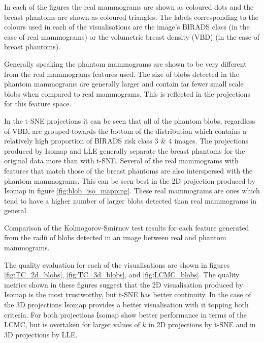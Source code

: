 In each of the figures the real mammograms are shown as coloured dots and the breast phantoms are shown as coloured triangles. The labels corresponding to the colours used in each of the visualisations are the image's BIRADS class (in the case of real mammograms) or the volumetric breast density (VBD) (in the case of breast phantoms).

Generally speaking the phantom mammograms are shown to be very different from the real mammograms features used. The size of blobs detected in the phantom mammograms are generally larger and contain far fewer small scale blobs when compared to real mammograms. This is reflected in the projections for this feature space. 

In the t-SNE projections it can be seen that all of the phantom blobs, regardless of VBD, are grouped towards the bottom of the distribution which contains a relatively high proportion of BIRADS risk class 3 \& 4 images. The projections produced by Isomap and LLE generally separate the breast phantoms for the original data more than with t-SNE. Several of the real mammograms with features that match those of the breast phantoms are also interspersed with the phantom mammograms. This can be seen best in the 2D projection produced by Isomap in figure \ref{fig:blob_iso_mapping}. These real mammograms are ones which tend to have a higher number of larger blobs detected than real mammograms in general.

\begin{table}[H]
\label{table:blob_features_ks}
\centering
{}
\caption{Comparison of the Kolmogorov-Smirnov test results for each feature generated from the radii of blobs detected in an image between real and phantom mammograms.}
\end{table}

The quality evaluation for each of the visualisations are shown in figures \ref{fig:TC_2d_blobs}, \ref{fig:TC_3d_blobs}, and \ref{fig:LCMC_blobs}. The quality metrics shown in these figures suggest that the 2D visualisation produced by Isomap is the most trustworthy, but t-SNE has better continuity. In the case of the 3D projections Isomap provides a better visualisation with it topping both criteria. For both projections Isomap show better performance in terms of the LCMC, but is overtaken for larger values of $k$ in 2D projections by t-SNE and in 3D projections by LLE. 

\clearpage

